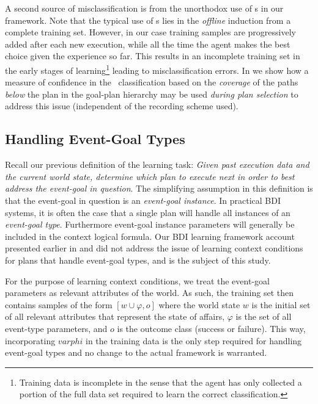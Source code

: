 A second source of misclassification is from the unorthodox use of \dt s in our framework. Note that the typical use of \dt s lies in the \textit{offline} induction from a complete training set. However, in our case training samples are progressively added after each new execution, while all the time the agent makes the best choice given the experience so far. This results in an incomplete training set in the early stages of learning\footnote{Training data is incomplete in the sense that the agent has only collected a portion of the full data set required to learn the correct classification.} leading to misclassification errors. In \cite{Singh:AAMAS10} we show how a measure of confidence in the \dt\ classification based on the \textit{coverage} of the paths \textit{below} the plan in the goal-plan hierarchy may be used \textit{during plan selection} to address this issue (independent of the recording scheme used).

\subsection{Handling Event-Goal Types}
Recall our previous definition of the learning task: \textit{Given past execution data and the current world state, determine which plan to execute next in order to best address the event-goal in question}. The simplifying assumption in this definition is that the event-goal in question is an \textit{event-goal instance}. In practical BDI systems, it is often the case that a single plan will handle all instances of an \textit{event-goal type}. Furthermore event-goal instance parameters will generally be included in the context logical formula. Our BDI learning framework account presented earlier in \cite{Airiau:IJAT:09} and \cite{Singh:AAMAS10} did not address the issue of learning context conditions for plans that handle event-goal types, and is the subject of this study.

For the purpose of learning context conditions, we treat the event-goal parameters as relevant attributes of the world. As such, the training set then contains samples of the form $[w \cup \varphi,o]$ where the world state $w$ is the initial set of all relevant attributes that represent the state of affairs, $\varphi$ is the set of all event-type parameters, and $o$ is the outcome class (success or failure). This way, incorporating $varphi$ in the training data is the only step required for handling event-goal types and no change to the actual framework is warranted.

